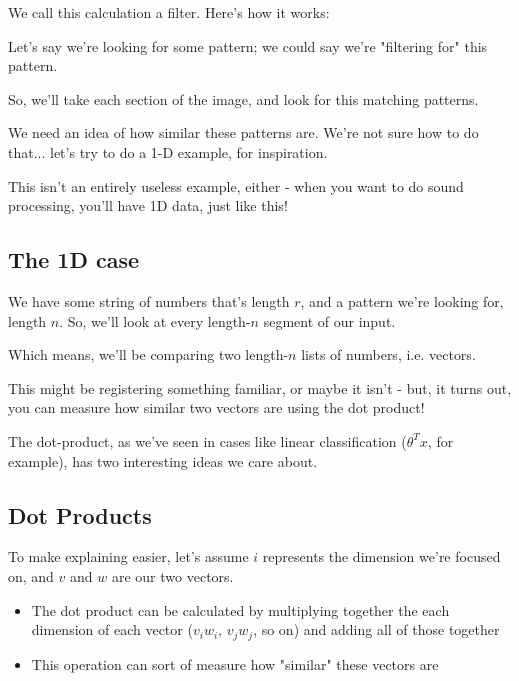         We call this calculation a filter. Here's how it works:
        
        Let's say we're looking for some pattern; we could say we're "filtering for" this pattern.
        
        So, we'll take each section of the image, and look for this matching patterns.
        
        We need an idea of how similar these patterns are. We're not sure how to do that... let's try to do a 1-D example, for inspiration.
        
        This isn't an entirely useless example, either - when you want to do sound processing, you'll have 1D data, just like this!
    
    \subsection{The 1D case}
    
        We have some string of numbers that's length $r$, and a pattern we're looking for, length $n$. So, we'll look at every length-$n$ segment of our input.
        
        Which means, we'll be comparing two length-$n$ lists of numbers, i.e. vectors.
        
        This might be registering something familiar, or maybe it isn't - but, it turns out, you can measure how similar two vectors are using the dot product!
        
        The dot-product, as we've seen in cases like linear classification ($\theta^T x$, for example), has two interesting ideas we care about.
    
    \subsection{Dot Products}
    
        To make explaining easier, let's assume $i$ represents the dimension we're focused on, and $v$ and $w$ are our two vectors.
        
        \begin{itemize}
            \item The dot product can be calculated by multiplying together the each dimension of each vector ($v_iw_i$, $v_jw_j$, so on) and adding all of those together
            \item This operation can sort of measure how "similar" these vectors are
        \end{itemize}
        
